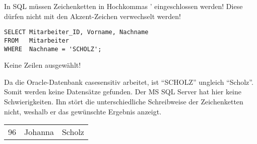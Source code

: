           \begin{merke}
            In SQL müssen Zeichenketten in Hochkommas ' eingeschlossen werden! Diese dürfen nicht mit den Akzent-Zeichen verwechselt werden!
          \end{merke}
          \begin{lstlisting}[language=oracle_sql,caption={Ein einfacher Zeichenkettenvergleich},label=sql02_07]
SELECT Mitarbeiter_ID, Vorname, Nachname
FROM   Mitarbeiter
WHERE  Nachname = 'SCHOLZ';
          \end{lstlisting}
          \begin{center}
            \begin{small}
              \begin{oraclesql}
Keine Zeilen ausgewählt!
              \end{oraclesql}
            \end{small}
          \end{center}
          Da die Oracle-Datenbank casesensitiv arbeitet, ist \enquote{SCHOLZ} ungleich \enquote{Scholz}. Somit werden keine Datensätze gefunden. Der MS SQL Server hat hier keine Schwierigkeiten. Ihn stört die unterschiedliche Schreibweise der Zeichenketten nicht, weshalb er das gewünschte Ergebnis anzeigt.
\clearpage
          \begin{center}
            \begin{small}
              \tablehead{}
              \begin{mssql}
                \begin{supertabular}{rll}
                  96 & Johanna & Scholz \\
                \end{supertabular}
              \end{mssql}
            \end{small}
          \end{center}
